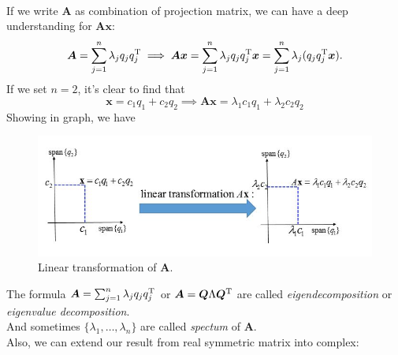 \newpage
\begin{example}\qquad\\
If we write $\bm A$ as combination of projection matrix, we can have a deep understanding for $\bm{Ax}$:
\[
\bm A=\sum_{j=1}^{n}\lambda_jq_jq_j^{\mathrm T}
\implies
\bm{Ax}=\sum_{j=1}^{n}\lambda_jq_jq_j^{\mathrm T}\bm x=
\sum_{j=1}^{n}\lambda_j(q_jq_j^{\mathrm T}\bm x).
\]
If we set $n=2$, it's clear to find that
\[
\bm x=c_1q_1+c_2q_2\implies
\bm{Ax}=\lambda_1c_1q_1+\lambda_2c_2q_2
\]
Showing in graph, we have
\begin{figure}[H]
\centering\includegraphics[width=12cm]{week6/spec}
\caption{Linear transformation of $\bm A$.}
\end{figure}
\end{example}
The formula $\bm A=\sum_{j=1}^{n}\lambda_jq_jq_j^{\mathrm T}$ or $\bm A=\bm Q\Lambda\bm Q^{\mathrm T}$ are called \emph{eigendecomposition} or \emph{eigenvalue decomposition}.\\
And sometimes $\{\lambda_1,\dots,\lambda_n\}$ are called \emph{spectum} of $\bm A$.\\
Also, we can extend our result from real symmetric matrix into complex:
